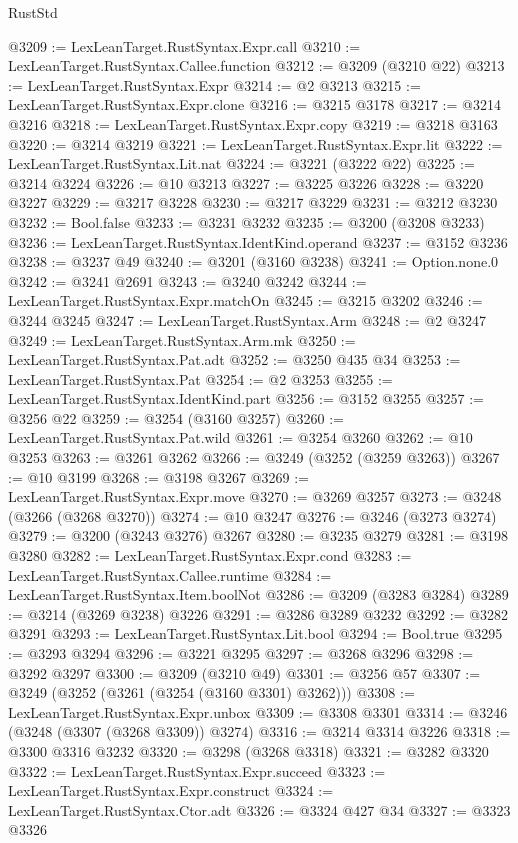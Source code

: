 \begin{lexlean}{RustStd}
\begin{coremodule}
{\begin{coremodule}
{{{{{{{{{{{{{{{{{{{{{{{{{@3209 := LexLeanTarget.RustSyntax.Expr.call
@3210 := LexLeanTarget.RustSyntax.Callee.function
@3212 := @3209 (@3210 @22)
@3213 := LexLeanTarget.RustSyntax.Expr
@3214 := @2 @3213
@3215 := LexLeanTarget.RustSyntax.Expr.clone
@3216 := @3215 @3178
@3217 := @3214 @3216
@3218 := LexLeanTarget.RustSyntax.Expr.copy
@3219 := @3218 @3163
@3220 := @3214 @3219
@3221 := LexLeanTarget.RustSyntax.Expr.lit
@3222 := LexLeanTarget.RustSyntax.Lit.nat
@3224 := @3221 (@3222 @22)
@3225 := @3214 @3224
@3226 := @10 @3213
@3227 := @3225 @3226
@3228 := @3220 @3227
@3229 := @3217 @3228
@3230 := @3217 @3229
@3231 := @3212 @3230
@3232 := Bool.false
@3233 := @3231 @3232
@3235 := @3200 (@3208 @3233)
@3236 := LexLeanTarget.RustSyntax.IdentKind.operand
@3237 := @3152 @3236
@3238 := @3237 @49
@3240 := @3201 (@3160 @3238)
@3241 := Option.none.{0}
@3242 := @3241 @2691
@3243 := @3240 @3242
@3244 := LexLeanTarget.RustSyntax.Expr.matchOn
@3245 := @3215 @3202
@3246 := @3244 @3245
@3247 := LexLeanTarget.RustSyntax.Arm
@3248 := @2 @3247
@3249 := LexLeanTarget.RustSyntax.Arm.mk
@3250 := LexLeanTarget.RustSyntax.Pat.adt
@3252 := @3250 @435 @34
@3253 := LexLeanTarget.RustSyntax.Pat
@3254 := @2 @3253
@3255 := LexLeanTarget.RustSyntax.IdentKind.part
@3256 := @3152 @3255
@3257 := @3256 @22
@3259 := @3254 (@3160 @3257)
@3260 := LexLeanTarget.RustSyntax.Pat.wild
@3261 := @3254 @3260
@3262 := @10 @3253
@3263 := @3261 @3262
@3266 := @3249 (@3252 (@3259 @3263))
@3267 := @10 @3199
@3268 := @3198 @3267
@3269 := LexLeanTarget.RustSyntax.Expr.move
@3270 := @3269 @3257
@3273 := @3248 (@3266 (@3268 @3270))
@3274 := @10 @3247
@3276 := @3246 (@3273 @3274)
@3279 := @3200 (@3243 @3276) @3267
@3280 := @3235 @3279
@3281 := @3198 @3280
@3282 := LexLeanTarget.RustSyntax.Expr.cond
@3283 := LexLeanTarget.RustSyntax.Callee.runtime
@3284 := LexLeanTarget.RustSyntax.Item.boolNot
@3286 := @3209 (@3283 @3284)
@3289 := @3214 (@3269 @3238) @3226
@3291 := @3286 @3289 @3232
@3292 := @3282 @3291
@3293 := LexLeanTarget.RustSyntax.Lit.bool
@3294 := Bool.true
@3295 := @3293 @3294
@3296 := @3221 @3295
@3297 := @3268 @3296
@3298 := @3292 @3297
@3300 := @3209 (@3210 @49)
@3301 := @3256 @57
@3307 := @3249 (@3252 (@3261 (@3254 (@3160 @3301) @3262)))
@3308 := LexLeanTarget.RustSyntax.Expr.unbox
@3309 := @3308 @3301
@3314 := @3246 (@3248 (@3307 (@3268 @3309)) @3274)
@3316 := @3214 @3314 @3226
@3318 := @3300 @3316 @3232
@3320 := @3298 (@3268 @3318)
@3321 := @3282 @3320
@3322 := LexLeanTarget.RustSyntax.Expr.succeed
@3323 := LexLeanTarget.RustSyntax.Expr.construct
@3324 := LexLeanTarget.RustSyntax.Ctor.adt
@3326 := @3324 @427 @34
@3327 := @3323 @3326
}}}}}}}}}}}}}}}}}}}}}}}}}
\end{coremodule}}
\end{coremodule}
\end{lexlean}
